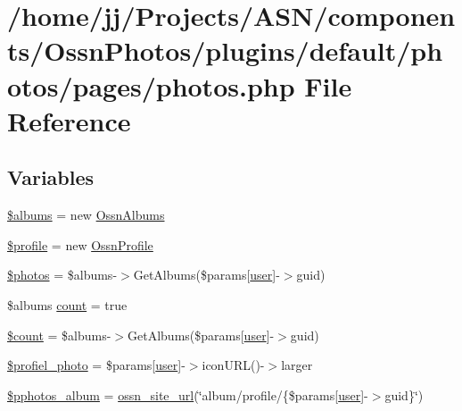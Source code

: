 \hypertarget{photos_2pages_2photos_8php}{}\section{/home/jj/\+Projects/\+A\+S\+N/components/\+Ossn\+Photos/plugins/default/photos/pages/photos.php File Reference}
\label{photos_2pages_2photos_8php}
\subsection*{Variables}
\begin{DoxyCompactItemize}
\item 
\hyperlink{photos_2pages_2photos_8php_a23e8244caaacd14d608137a383e8f0e7}{\$albums} = new \hyperlink{class_ossn_albums}{Ossn\+Albums}
\item 
\hyperlink{photos_2pages_2photos_8php_aada8b96bccbcf78962195b117acdc07b}{\$profile} = new \hyperlink{class_ossn_profile}{Ossn\+Profile}
\item 
\hyperlink{photos_2pages_2photos_8php_a7d16539c7a3688bee1d3184c81c47487}{\$photos} = \$albums-\/$>$Get\+Albums(\$params\mbox{[}\textquotesingle{}\hyperlink{ossn_8config_8db_8example_8php_a802544b7ba9f79bbf24ef67773d53bed}{user}\textquotesingle{}\mbox{]}-\/$>$guid)
\item 
\$albums \hyperlink{photos_2pages_2photos_8php_a364678aa3bd05301b3d1b8650653cf48}{count} = true
\item 
\hyperlink{photos_2pages_2photos_8php_af789423037bbc89dc7c850e761177570}{\$count} = \$albums-\/$>$Get\+Albums(\$params\mbox{[}\textquotesingle{}\hyperlink{ossn_8config_8db_8example_8php_a802544b7ba9f79bbf24ef67773d53bed}{user}\textquotesingle{}\mbox{]}-\/$>$guid)
\item 
\hyperlink{photos_2pages_2photos_8php_aab0bf08a0d7766d0c7ca7afe29e54d13}{\$profiel\+\_\+photo} = \$params\mbox{[}\textquotesingle{}\hyperlink{ossn_8config_8db_8example_8php_a802544b7ba9f79bbf24ef67773d53bed}{user}\textquotesingle{}\mbox{]}-\/$>$icon\+U\+RL()-\/$>$larger
\item 
\hyperlink{photos_2pages_2photos_8php_aadcb75bc0a6a2c89cf7d0fbe5a660c00}{\$pphotos\+\_\+album} = \hyperlink{ossn_8lib_8system_8php_a2f12f9244f99eccd1225afb76ef2ab65}{ossn\+\_\+site\+\_\+url}(\char`\"{}album/profile/\{\$params\mbox{[}\textquotesingle{}\hyperlink{ossn_8config_8db_8example_8php_a802544b7ba9f79bbf24ef67773d53bed}{user}\textquotesingle{}\mbox{]}-\/$>$guid\}\char`\"{})

\end{DoxyCompactItemize}
